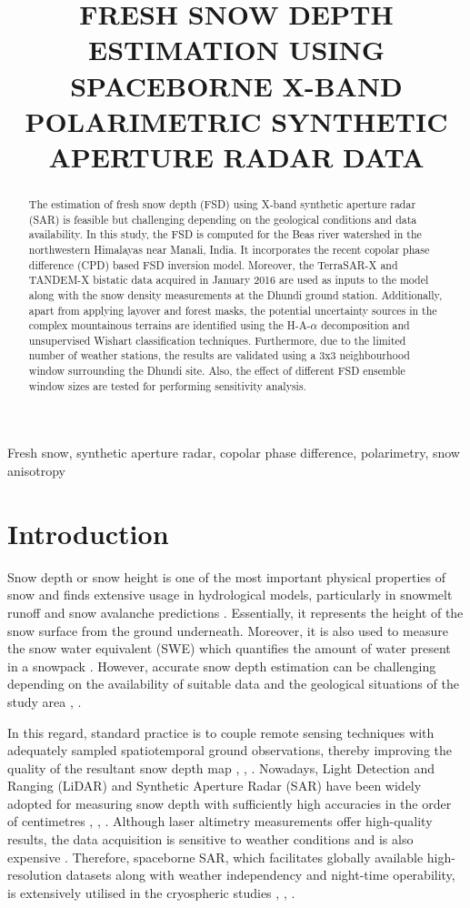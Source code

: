 \documentclass{article}
\title{FRESH SNOW DEPTH ESTIMATION USING SPACEBORNE X-BAND POLARIMETRIC SYNTHETIC APERTURE RADAR DATA}
\begin{document}
%
\maketitle
%
\begin{abstract}
The estimation of fresh snow depth (FSD) using X-band synthetic aperture radar (SAR) is feasible but challenging depending on the geological conditions and data availability. In this study, the FSD is computed for the Beas river watershed in the northwestern Himalayas near Manali, India. It incorporates the recent copolar phase difference (CPD) based FSD inversion model. Moreover, the TerraSAR-X and TANDEM-X bistatic data acquired in January 2016 are used as inputs to the model along with the snow density measurements at the Dhundi ground station. Additionally, apart from applying layover and forest masks, the potential uncertainty sources in the complex mountainous terrains are identified using the H-A-$\alpha$ decomposition and unsupervised Wishart classification techniques. Furthermore, due to the limited number of weather stations, the results are validated using a 3x3 neighbourhood window surrounding the Dhundi site. Also, the effect of different FSD ensemble window sizes are tested for performing sensitivity analysis.
\end{abstract}
%
\begin{keywords}
Fresh snow, synthetic aperture radar, copolar phase difference, polarimetry, snow anisotropy
\end{keywords}
%
\section{Introduction}
\label{sec:intro}
Snow depth or snow height is one of the most important physical properties of snow and finds extensive usage in hydrological models, particularly in snowmelt runoff and snow avalanche predictions \cite{Thakur2012}. Essentially, it represents the height of the snow surface from the ground underneath. Moreover, it is also used to measure the snow water equivalent (SWE) which quantifies the amount of water present in a snowpack \cite{Tedesco2015}. However, accurate snow depth estimation can be challenging depending on the availability of suitable data and the geological situations of the study area \cite{Leinss2014}, \cite{Leinss2015}.

In this regard, standard practice is to couple remote sensing techniques with adequately sampled spatiotemporal ground observations, thereby improving the quality of the resultant snow depth map \cite{Thakur2012}, \cite{Leinss2014}, \cite{Leinss2015}. Nowadays, Light Detection and Ranging (LiDAR) and Synthetic Aperture Radar (SAR) have been widely adopted for measuring snow depth with sufficiently high accuracies in the order of centimetres \cite{Tedesco2015}, \cite{Leinss2014}, \cite{Deems2013}. Although laser altimetry measurements offer high-quality results, the data acquisition is sensitive to weather conditions and is also expensive \cite{Deems2013}. Therefore, spaceborne SAR, which facilitates globally available high-resolution datasets along with weather independency and night-time operability, is extensively utilised in the cryospheric studies \cite{Thakur2012}, \cite{Leinss2014}, \cite{Moreira2013}.
\end{document}
